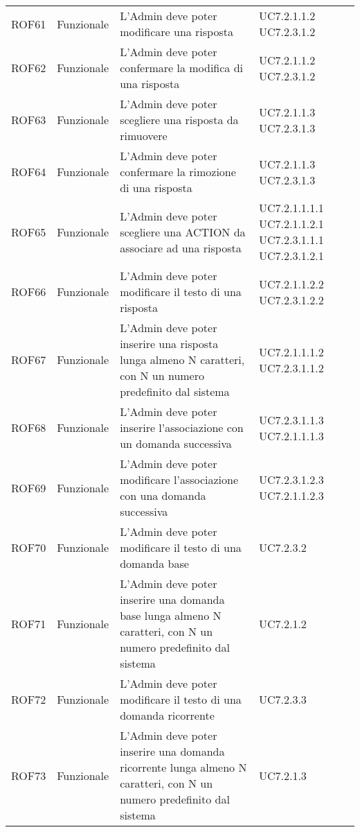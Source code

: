 \documentclass[../AnalisiDeiRequisiti_v3.0.0.tex]{subfiles}
\begin{document}
\begin{longtable}{p{2.5cm}!{\VRule[1pt]}p{2.5cm}!{\VRule[1pt]}p{5cm}!{\VRule[1pt]}p{2.5cm}}
	ROF61&Funzionale\newline  & L'Admin deve poter modificare una risposta & UC7.2.1.1.2 UC7.2.3.1.2 \\
	ROF62&Funzionale\newline  & L'Admin deve poter confermare la modifica di una risposta & UC7.2.1.1.2 UC7.2.3.1.2 \\
	ROF63&Funzionale\newline  & L'Admin deve poter scegliere una risposta da rimuovere & UC7.2.1.1.3 UC7.2.3.1.3 \\
	ROF64&Funzionale\newline  & L'Admin deve poter confermare la rimozione di una risposta & UC7.2.1.1.3 UC7.2.3.1.3 \\
	ROF65&Funzionale\newline  & L'Admin deve poter scegliere una ACTION da associare ad una risposta & UC7.2.1.1.1.1 UC7.2.1.1.2.1 UC7.2.3.1.1.1 UC7.2.3.1.2.1\\
	ROF66&Funzionale\newline  & L'Admin deve poter modificare il testo di una risposta & UC7.2.1.1.2.2 UC7.2.3.1.2.2 \\
	ROF67&Funzionale\newline  & L'Admin deve poter inserire una risposta lunga almeno N caratteri, con N un numero predefinito dal sistema & UC7.2.1.1.1.2 UC7.2.3.1.1.2 \\
	ROF68&Funzionale\newline  & L'Admin deve poter inserire l'associazione con un domanda successiva & UC7.2.3.1.1.3 UC7.2.1.1.1.3 \\
	ROF69&Funzionale\newline  & L'Admin deve poter modificare l'associazione con una domanda successiva & UC7.2.3.1.2.3 UC7.2.1.1.2.3 \\
	ROF70&Funzionale\newline  & L'Admin deve poter modificare il testo di una domanda base & UC7.2.3.2 \\
	ROF71&Funzionale\newline  & L'Admin deve poter inserire una domanda base lunga almeno N caratteri, con N un numero predefinito dal sistema & UC7.2.1.2 \\
	ROF72&Funzionale\newline  & L'Admin deve poter modificare il testo di una domanda ricorrente & UC7.2.3.3 \\
	ROF73&Funzionale\newline  & L'Admin deve poter inserire una domanda ricorrente lunga almeno N caratteri, con N un numero predefinito dal sistema & UC7.2.1.3 \\

\end{longtable}
\end{document}
